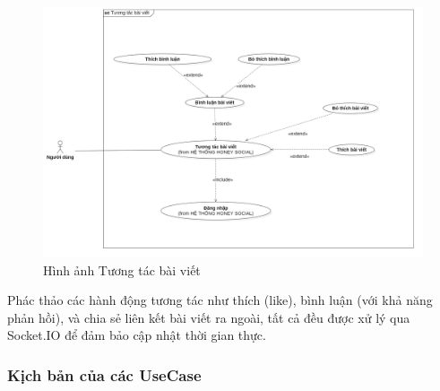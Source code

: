 \begin{figure}[H]
    \centering
    \includegraphics[width=1\textwidth]{image/MoHinh/12.png}
    \caption{Hình ảnh Tương tác bài viết}
    \label{fig:tuong_tac_bai_viet}
\end{figure}
Phác thảo các hành động tương tác như thích (like), bình luận (với khả năng phản hồi), và chia sẻ liên kết bài viết ra ngoài, tất cả đều được xử lý qua Socket.IO để đảm bảo cập nhật thời gian thực.

\newpage

\subsubsection{Kịch bản của các UseCase}


